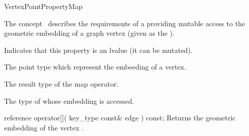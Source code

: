 
\begin{ccRefConcept}{VertexPointPropertyMap}


\ccDefinition

The concept \ccRefName\ describes the requirements of a  
providing mutable access to the geometric embedding of a graph vertex
(given as the ).

\ccRefines
  
\ccTypes
    {Indicates that this property is an lvalue (it can be mutated).}
  
    {The point type which represent the embeeding of a vertex.}
    
    {The result type of the map operator.}

  {The type of  whose embedding is accessed.}

\ccCreation
{}  %

\ccOperations

\ccMethod
  {reference operator[]( key_type const& edge ) const;}
  {Returns the geometric embedding of the vertex .}  
  
\ccHasModels
{}\\

\ccSeeAlso
{} 

\end{ccRefConcept}



